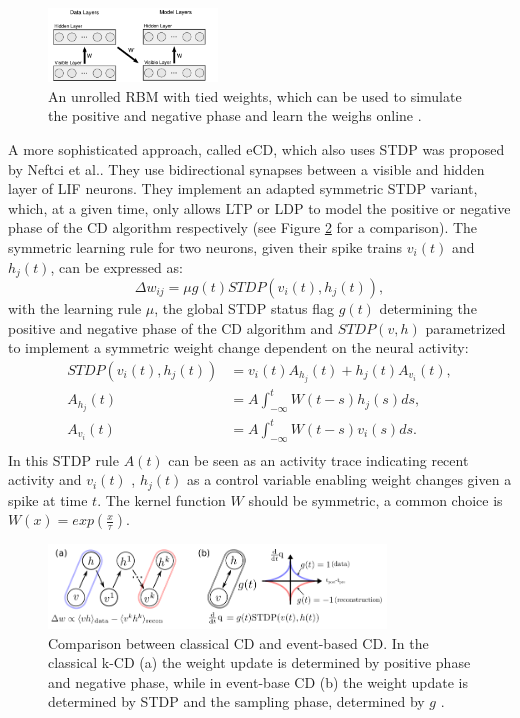 \begin{figure}
	\centering
    	\includegraphics[width=0.4\textwidth]{imgs/evtCD.png} 
    \caption[An unrolled RBM with tied weights for CD.]{An unrolled RBM with tied weights, which can be used to simulate the positive and negative phase and learn the weighs online \cite{Neil2013}.}
	\label{fig:evtCD}
\end{figure}

A more sophisticated approach, called eCD, which also uses STDP was proposed by Neftci et al.\cite{Neftci2013}.
They use bidirectional synapses between a visible and hidden layer of LIF neurons.
They implement an adapted symmetric STDP variant, which, at a given time, only allows LTP or LDP to model the positive or negative phase of the CD algorithm respectively (see Figure \ref{fig:ecdcomp} for a comparison). 
The symmetric learning rule for two neurons, given their spike trains $v_i(t)$ and $h_j(t)$, can be expressed as:
\[
\Delta w_{ij} = \mu g(t) STDP(v_i(t), h_j(t)),
\]
with the learning rule $\mu$, the global STDP status flag $g(t)$ determining the positive and negative phase of the CD algorithm and $STDP(v, h)$ parametrized to implement a symmetric weight change dependent on the neural activity:
\[
\begin{split}
STDP(v_i(t), h_j(t)) &= v_i(t) A_{h_j}(t) + h_j(t) A_{v_i}(t), \\
A_{h_j}(t) &= A \int_{- \infty}^t W(t-s) h_j(s) ds, \\ 
A_{v_i}(t) &= A \int_{- \infty}^t W(t-s) v_i(s) ds. \\ 
\end{split}
\]
In this STDP rule $A(t)$ can be seen as an activity trace indicating recent activity and $v_i(t)$ , $h_j(t)$ as a control variable enabling weight changes given a spike at time $t$.    
The kernel function $W$ should be symmetric, a common choice is $W(x) = exp(\frac{x}{\tau})$. 

\begin{figure}
	\centering
    	\includegraphics[width=0.8\textwidth]{imgs/eCD2.png} 
    \caption[Comparison between classical CD and event-based CD.]{Comparison between classical CD and event-based CD. In the classical k-CD (a) the weight update is determined by positive phase and negative phase, while in event-base CD (b) the weight update is determined by STDP and the sampling phase, determined by $g$ \cite{Neftci2013}.}
	\label{fig:ecdcomp}
\end{figure}
  
